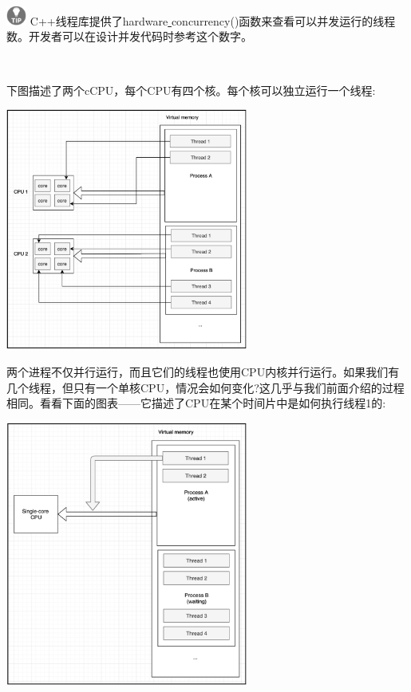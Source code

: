\hspace*{\fill} \\ %
\includegraphics[width=0.05\textwidth]{images/tip}
C++线程库提供了hardware\underline{ }concurrency()函数来查看可以并发运行的线程数。开发者可以在设计并发代码时参考这个数字。 \par
\noindent\textbf{}\ \par

下图描述了两个cCPU，每个CPU有四个核。每个核可以独立运行一个线程: \par

\begin{center}
	\includegraphics[width=0.6\textwidth]{content/Section-2/Chapter-8/10}
\end{center}

两个进程不仅并行运行，而且它们的线程也使用CPU内核并行运行。如果我们有几个线程，但只有一个单核CPU，情况会如何变化?这几乎与我们前面介绍的过程相同。看看下面的图表——它描述了CPU在某个时间片中是如何执行线程1的: \par

\begin{center}
	\includegraphics[width=0.6\textwidth]{content/Section-2/Chapter-8/11}
\end{center}

